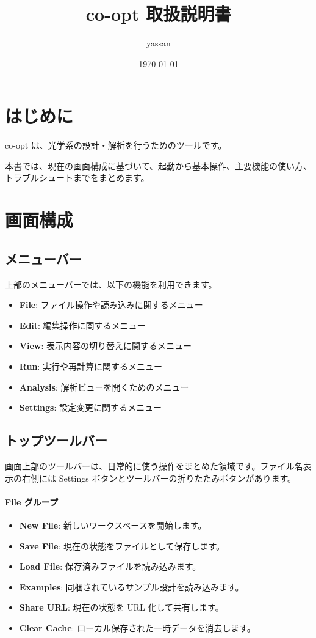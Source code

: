 \documentclass[11pt]{article}
\title{co-opt 取扱説明書}
\author{yassan}
\date{\today}
\begin{document}
\maketitle
\tableofcontents

\section{はじめに}
co-opt は、光学系の設計・解析を行うためのツールです。\par
本書では、現在の画面構成に基づいて、起動から基本操作、主要機能の使い方、トラブルシュートまでをまとめます。

\section{画面構成}
\subsection{メニューバー}
上部のメニューバーでは、以下の機能を利用できます。
\begin{itemize}
  \item \textbf{File}: ファイル操作や読み込みに関するメニュー
  \item \textbf{Edit}: 編集操作に関するメニュー
  \item \textbf{View}: 表示内容の切り替えに関するメニュー
  \item \textbf{Run}: 実行や再計算に関するメニュー
  \item \textbf{Analysis}: 解析ビューを開くためのメニュー
  \item \textbf{Settings}: 設定変更に関するメニュー
\end{itemize}

\subsection{トップツールバー}
画面上部のツールバーは、日常的に使う操作をまとめた領域です。ファイル名表示の右側には Settings ボタンとツールバーの折りたたみボタンがあります。

\paragraph{File グループ}
\begin{itemize}
  \item \textbf{New File}: 新しいワークスペースを開始します。
  \item \textbf{Save File}: 現在の状態をファイルとして保存します。
  \item \textbf{Load File}: 保存済みファイルを読み込みます。
  \item \textbf{Examples}: 同梱されているサンプル設計を読み込みます。
  \item \textbf{Share URL}: 現在の状態を URL 化して共有します。
  \item \textbf{Clear Cache}: ローカル保存された一時データを消去します。
\end{itemize}
\end{document}
